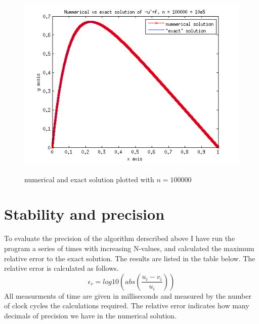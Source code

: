 \documentclass[a4paper,english, 10pt, twoside]{article}
\begin{document}
\begin{figure}[H]
\begin{center}
\includegraphics[scale=0.75]{plot_n100000.png}\\
\caption{numerical and exact solution plotted with $n = 100000$}
\end{center}
\end{figure}

\section*{Stability and precision}
To evaluate the precision of the algorithm derscribed above I have run the program a series of times with increasing N-values, and
calculated the maximum relative error to the exact solution. The results are listed in the table below. The relative error is 
calculated as follows.\\
$$
\epsilon_r = log10\left(abs\left(\frac{u_i - v_i}{u_i}\right)\right)
$$
All measurments of time are given in milliseconds and measured by the number of clock cycles the calculations required.
The relative error indicates how many decimals of precision we have in the numerical solution.\\
\end{document}
